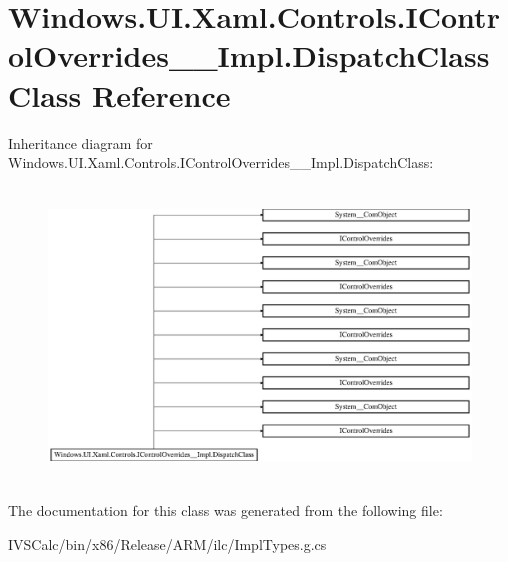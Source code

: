\hypertarget{class_windows_1_1_u_i_1_1_xaml_1_1_controls_1_1_i_control_overrides_____impl_1_1_dispatch_class}{}\section{Windows.\+U\+I.\+Xaml.\+Controls.\+I\+Control\+Overrides\+\_\+\+\_\+\+Impl.\+Dispatch\+Class Class Reference}
\label{class_windows_1_1_u_i_1_1_xaml_1_1_controls_1_1_i_control_overrides_____impl_1_1_dispatch_class}
Inheritance diagram for Windows.\+U\+I.\+Xaml.\+Controls.\+I\+Control\+Overrides\+\_\+\+\_\+\+Impl.\+Dispatch\+Class\+:\begin{figure}[H]
\begin{center}
\leavevmode
\includegraphics[height=7.837150cm]{class_windows_1_1_u_i_1_1_xaml_1_1_controls_1_1_i_control_overrides_____impl_1_1_dispatch_class}
\end{center}
\end{figure}


The documentation for this class was generated from the following file\+:\begin{DoxyCompactItemize}
\item 
I\+V\+S\+Calc/bin/x86/\+Release/\+A\+R\+M/ilc/Impl\+Types.\+g.\+cs\end{DoxyCompactItemize}
